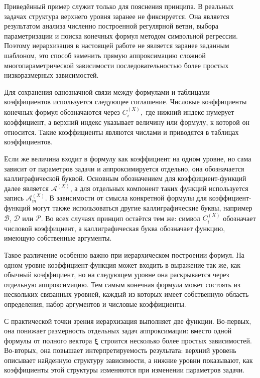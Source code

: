 Приведённый пример служит только для пояснения принципа. В реальных задачах структура верхнего уровня заранее не фиксируется. Она является результатом анализа численно построенной регулярной ветви, выбора параметризации и поиска конечных формул методом символьной регрессии. Поэтому иерархизация в настоящей работе не является заранее заданным шаблоном, это способ заменить прямую аппроксимацию сложной многопараметрической зависимости последовательностью более простых низкоразмерных зависимостей.

Для сохранения однозначной связи между формулами и таблицами коэффициентов используется следующее соглашение. Числовые коэффициенты конечных формул обозначаются через \(C_i^{(X)},\) где нижний индекс нумерует коэффициент, а верхний индекс указывает величину или формулу, к которой он относится. Такие коэффициенты являются числами и приводятся в таблицах коэффициентов.

Если же величина входит в формулу как коэффициент на одном уровне, но сама зависит от параметров задачи и аппроксимируется отдельно, она обозначается каллиграфической буквой. Основным обозначением для коэффициент-функций далее является \( \mathcal A^{(X)} \), а для отдельных компонент таких функций используется запись \(\mathcal A_m^{(X)}.\)
В зависимости от смысла конкретной формулы для коэффициент-функций могут также использоваться другие каллиграфические буквы, например \(\mathcal B\), \(\mathcal D\) или \(\mathcal P\). Во всех случаях принцип остаётся тем же: символ \(C_i^{(X)}\) обозначает числовой коэффициент, а каллиграфическая буква обозначает функцию, имеющую собственные аргументы.

Такое различение особенно важно при иерархическом построении формул. На одном уровне коэффициент-функция может входить в выражение так же, как обычный коэффициент, но на следующем уровне она раскрывается через отдельную аппроксимацию. Тем самым конечная формула может состоять из нескольких связанных уровней, каждый из которых имеет собственную область определения, набор аргументов и числовые коэффициенты.

С практической точки зрения иерархизация выполняет две функции. Во-первых, она понижает размерность отдельных задач аппроксимации: вместо одной формулы от полного вектора \(\boldsymbol\xi\) строится несколько более простых зависимостей. Во-вторых, она повышает интерпретируемость результата: верхний уровень описывает найденную структуру зависимости, а нижние уровни показывают, как коэффициенты этой структуры изменяются при изменении параметров задачи.


